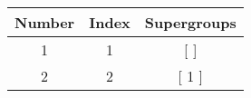 \begin{center}
\begin{longtable}[H]{|| c c c ||}
\hline
Number & Index & Supergroups \\ 
\hline
1 & 1 & [  ] \\ 
\hline
2 & 2 & [ 1 ] \\ 
\hline
\end{longtable}
\end{center}
